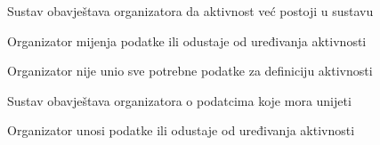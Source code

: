 \begin{packed_item}
\begin{packed_item}
\begin{packed_enum}
								\item Sustav obavještava organizatora da aktivnost već postoji u sustavu
								\item Organizator mijenja podatke ili odustaje od uređivanja aktivnosti 
								
							\end{packed_enum}
							\item[6.b] Organizator nije unio sve potrebne podatke za definiciju aktivnosti
							\item[] \begin{packed_enum}
								
								\item Sustav obavještava organizatora o podatcima koje mora unijeti
								\item Organizator unosi podatke ili odustaje od uređivanja aktivnosti 
								
							\end{packed_enum}
							
						\end{packed_item}
					\end{packed_item}
				
